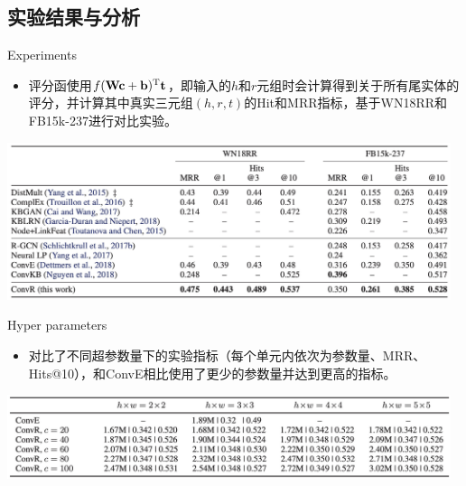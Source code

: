 \subsection{实验结果与分析}

\begin{frame}[c]{Experiments}

\begin{itemize}
    \item 评分函使用$f({\rm \mathbf{Wc+b}})^{\rm T}{\rm \mathbf{t}}$，即输入的$h$和$r$元组时会计算得到关于所有尾实体的评分，并计算其中真实三元组$(h,r,t)$的Hit和MRR指标，基于WN18RR和FB15k-237进行对比实验。
\end{itemize}

\begin{center}
    \includegraphics[width=13cm]{assets/5.png}
\end{center}

\end{frame}

\begin{frame}[c]{Hyper parameters}

\begin{itemize}
    \item 对比了不同超参数量下的实验指标（每个单元内依次为参数量、MRR、Hits@10），和ConvE相比使用了更少的参数量并达到更高的指标。
\end{itemize}

\begin{center}
    \includegraphics[width=13cm]{assets/6.png}
\end{center}

\end{frame}

